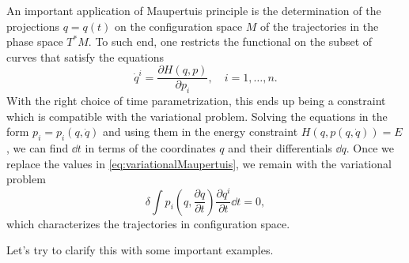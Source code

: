 \documentclass[english,fontsize=11pt,paper=b5]{scrbook}
\numberwithin{equation}{chapter}
\theoremstyle{definition}
\begin{document}
    An important application of Maupertuis principle is the determination of the projections $q=q(t)$ on the configuration space $M$ of the trajectories in the phase space $T^*M$.
    To such end, one restricts the functional on the subset of curves that satisfy the equations
    \begin{equation}
      \dot q^i = \frac{\partial H(q,p)}{\partial p_i}, \quad i=1,\ldots,n.
    \end{equation}
    With the right choice of time parametrization, this ends up being a constraint which is compatible with the variational problem.
    Solving the equations in the form $p_i = p_i(q,\dot q)$ and using them in the energy constraint $H(q, p(q,\dot q))=E$, we can find $\dd t$ in terms of the coordinates $q$ and their differentials $\dd q$. Once we replace the values in \eqref{eq:variationalMaupertuis}, we remain with the variational problem
    \begin{equation}
      \delta \int p_i\left(q, \frac{\partial q}{\partial t}\right) \frac{\partial q^i}{\partial t} \dd t = 0,
    \end{equation}
    which characterizes the trajectories in configuration space.

    Let's try to clarify this with some important examples.
\end{document}
